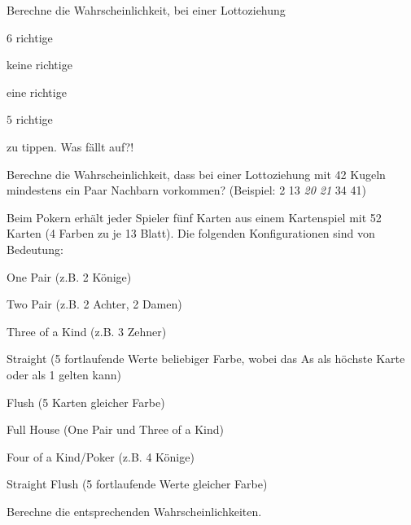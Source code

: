 \documentclass[%
11pt,%
twoside,%
titlepage,%
german,%
headsepline%
]{scrartcl}
\begin{document}
\begin{ueb}[Lotto]
Berechne
die Wahrscheinlichkeit, bei einer Lottoziehung

\begin{minipage}{0.45\textwidth}
\begin{enumeratea}
\item $6$ richtige
\item keine richtige
\end{enumeratea}
\end{minipage}
\begin{minipage}{0.45\textwidth}
\begin{enumeratea}
\setcounter{enumi}{2}
\item eine richtige
\item $5$ richtige
\end{enumeratea}
\end{minipage}

zu tippen. Was fällt auf?!
\end{ueb}

\begin{ueb}
Berechne
die Wahrscheinlichkeit, dass bei einer Lottoziehung mit 42 Kugeln mindestens ein Paar Nachbarn vorkommen? (Beispiel: 2 13 \emph{20 21} 34 41)
\end{ueb}

\begin{ueb}
Beim
Pokern
erhält jeder Spieler fünf Karten aus einem Kartenspiel mit 52 Karten (4 Farben zu je 13 Blatt). Die folgenden Konfigurationen sind von Bedeutung:
\begin{enumeratea}
\item One Pair (z.B. 2 Könige)
\item Two Pair (z.B. 2 Achter, 2 Damen)
\item Three of a Kind (z.B. 3 Zehner)
\item Straight (5 fortlaufende Werte beliebiger Farbe, wobei das As als höchste Karte oder als 1 gelten
kann)
\item Flush (5 Karten gleicher Farbe)
\item Full House (One Pair und Three of a Kind)
\item Four of a Kind/Poker (z.B. 4 Könige)
\item Straight Flush (5 fortlaufende Werte gleicher Farbe)
\end{enumeratea}
Berechne die entsprechenden Wahrscheinlichkeiten.
\end{ueb}
\end{document}
